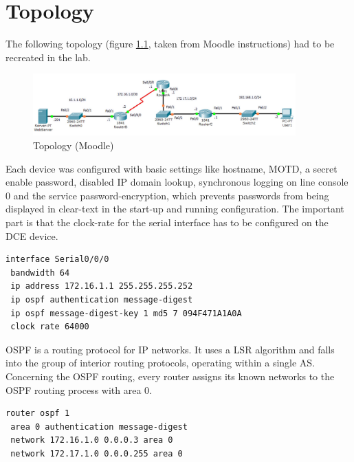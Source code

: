 \chapter{Topology}

\thispagestyle{standard}
\pagestyle{standard}

The following topology (figure \ref{img:topo}, taken from Moodle instructions) had to be recreated in the lab.

\begin{figure}[H]
	\centering
	\includegraphics[width=0.9\textwidth]{img/topo.png}
	\caption{Topology (Moodle)}
	\label{img:topo}
\end{figure}

Each device was configured with basic settings like hostname, \ac{MOTD}, a secret enable password, disabled IP domain lookup, synchronous logging on line console 0 and the service password-encryption, which prevents passwords from being displayed in clear-text in the start-up and running configuration. The important part is that the clock-rate for the serial interface has to be configured on the \ac{DCE} device.

\begin{lstlisting}[caption={Setting the clock-rate on Router A},label={lst:clockrate},language={}]
interface Serial0/0/0
 bandwidth 64
 ip address 172.16.1.1 255.255.255.252
 ip ospf authentication message-digest
 ip ospf message-digest-key 1 md5 7 094F471A1A0A
 clock rate 64000
\end{lstlisting}

\ac{OSPF} is a routing protocol for \ac{IP} networks. It uses a \ac{LSR} algorithm and falls into the group of interior routing protocols, operating within a single \ac{AS}.
Concerning the \ac{OSPF} routing, every router assigns its known networks to the \ac{OSPF} routing process with area 0.
\newpage
{}%
\begin{lstlisting}[caption={\ac{OSPF} routing example router A},label={lst:ospf},language={}]
router ospf 1
 area 0 authentication message-digest
 network 172.16.1.0 0.0.0.3 area 0
 network 172.17.1.0 0.0.0.255 area 0
\end{lstlisting}

